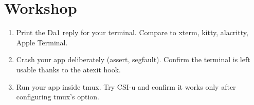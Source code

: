 \section*{Workshop}

\begin{enumerate}[leftmargin=*]
  \item Print the Da1 reply for your terminal. Compare to
    xterm, kitty, alacritty, Apple Terminal.
  \item Crash your app deliberately (assert, segfault).
    Confirm the terminal is left usable thanks to the
    atexit hook.
  \item Run your app inside tmux. Try CSI-u and confirm it
    works only after configuring tmux's
     option.
\end{enumerate}
